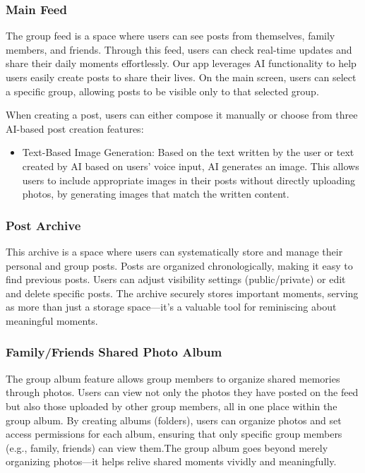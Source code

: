         \subsubsection{Main Feed}
            The group feed is a space where users can see posts from themselves, family members, and friends. Through this feed, users can check real-time updates and share their daily moments effortlessly. Our app leverages AI functionality to help users easily create posts to share their lives. On the main screen, users can select a specific group, allowing posts to be visible only to that selected group.

            When creating a post, users can either compose it manually or choose from three AI-based post creation features:
            \begin{itemize}
                \item Text-Based Image Generation: Based on the text written by the user or text created by AI based on users' voice input, AI generates an image. This allows users to include appropriate images in their posts without directly uploading photos, by generating images that match the written content.
            \end{itemize}

        \subsubsection{Post Archive}
            This archive is a space where users can systematically store and manage their personal and group posts. Posts are organized chronologically, making it easy to find previous posts. Users can adjust visibility settings (public/private) or edit and delete specific posts. The archive securely stores important moments, serving as more than just a storage space—it’s a valuable tool for reminiscing about meaningful moments.

        \subsubsection{Family/Friends Shared Photo Album}
            The group album feature allows group members to organize shared memories through photos. Users can view not only the photos they have posted on the feed but also those uploaded by other group members, all in one place within the group album. By creating albums (folders), users can organize photos and set access permissions for each album, ensuring that only specific group members (e.g., family, friends) can view them.The group album goes beyond merely organizing photos—it helps relive shared moments vividly and meaningfully.

